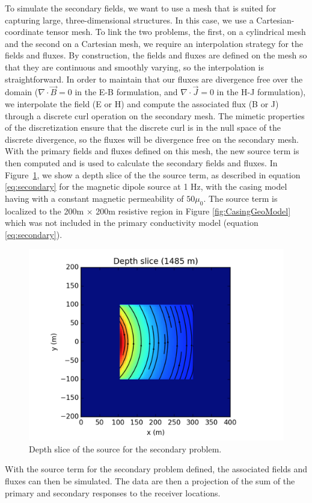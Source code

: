 \documentclass{segabs}
\renewcommand{\div}{{\nabla \cdot}}
\begin{document}
To simulate the secondary fields, we want to use a mesh that is suited for capturing large, three-dimensional structures. In this case, we use a Cartesian-coordinate tensor mesh. To link the two problems, the first, on a cylindrical mesh and the second on a Cartesian mesh, we require an interpolation strategy for the fields and fluxes. By construction, the fields and fluxes are defined on the mesh so that they are continuous and smoothly varying, so the interpolation is straightforward. In order to maintain that our fluxes are divergence free over the domain ($\div \vec{B} = 0$ in the E-B formulation, and $\div \vec{J} = 0$ in the H-J formulation), we interpolate the field (E or H) and compute the associated flux (B or J) through a discrete curl operation on the secondary mesh. The mimetic properties of the discretization ensure that the discrete curl is in the null space of the discrete divergence, so the fluxes will be divergence free on the secondary mesh. With the primary fields and fluxes defined on this mesh, the new source term is then computed and is used to calculate the secondary fields and fluxes. In Figure~\ref{fig:secondarySource}, we show a depth slice of the the source term, as described in equation \ref{eq:secondary} for the magnetic dipole source at 1 Hz, with the casing model having with a constant magnetic permeability of $50 \mu_0$. The source term is localized to the 200m $\times$ 200m resistive region in Figure \ref{fig:CasingGeoModel} which was not included in the primary conductivity model (equation \ref{eq:secondary}).
\begin{figure}[h!]
	\centering
	\includegraphics[width=0.95\columnwidth]{./Figures/SecSource}
	\caption{Depth slice of the source for the secondary problem. }
	\label{fig:secondarySource}
\end{figure}
With the source term for the secondary problem defined, the associated fields and fluxes can then be simulated. The data are then a projection of the sum of the primary and secondary responses to the receiver locations.
\end{document}
